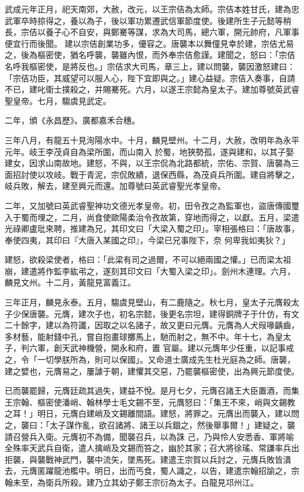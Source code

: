 \begin{pinyinscope}
 武成元年正月，祀天南郊，大赦，改元，以王宗佶為太師。宗佶本姓甘氏，建為忠武軍卒時掠得之，養以為子，後以軍功累遷武信軍節度使。後建所生子元懿等稍長，宗佶以養子心不自安，與鄭騫等謀，求為大司馬，總六軍，開元帥府，凡軍事便宜行而後聞。
 建以宗佶創業功多，優容之。唐襲本以舞僮見幸於建，宗佶尤易之，後為樞密使，猶名呼襲，襲雖內恨，而外奉宗佶愈謹。建聞之，怒曰：「宗佶名呼我樞密使，是將反也。」宗佶求大司馬，章三上，建以問襲，襲因激怒建曰：「宗佶功臣，其威望可以服人心，陛下宜即與之。」建心益疑。宗佶入奏事，自請不已，建叱衛士撲殺之，并賜騫死。六月，以遂王宗懿為皇太子。建加尊號英武睿聖皇帝。七月，騶虞見武定。



 二年，頒《永昌歷》。廣都嘉禾合穗。



 三年八月，有龍五十見洵陽水中。十月，麟見壁州。十二月，大赦，改明年為永平元年。岐王李茂貞自為梁所圍，而山南入
 於蜀，地狹勢孤，遂與建和，以其子娶建女，因求山南故地。建怒，不與，以王宗侃為北路都統，宗佑、宗賀、唐襲為三面招討使以攻岐。戰于青泥，宗侃敗績，退保西縣，為茂貞兵所圍。建自將擊之，岐兵敗，解去，建至興元而還。加尊號曰英武睿聖光孝皇帝。



 二年，又加號曰英武睿聖神功文德光孝皇帝。初，田令孜之為監軍也，盜唐傳國璽入于蜀而埋之，二月，尚食使歐陽柔治令孜故第，穿地而得之，以獻。五月，梁遣光祿卿盧玭來聘，推建為兄，其印文曰「大梁入蜀之印」。宰相張格曰：「唐故事，奉使四夷，其印曰『大唐入某國之印』，今梁已兄事陛下，奈
 何卑我如夷狄？」



 建怒，欲殺梁使者，格曰：「此梁有司之過爾，不可以絕兩國之懽。」已而梁太祖崩，建遣將作監李紘弔之，遂刻其印文曰「大蜀入梁之印」。劍州木連理。六月，麟見文州。十二月，黃龍見富義江。



 三年正月，麟見永泰。五月，騶虞見壁山，有二鹿隨之。秋七月，皇太子元膺殺太子少保唐襲。元膺，建次子也，初名宗懿，後更名宗坦，建得銅牌子于什仿，有文二十餘字，建以為符讖，因取之以名諸子，故又更曰元膺。元膺為人犬叚喙齲齒，多材藝，能射錢中孔，嘗自抱畫球擲馬上，馳而射之，無不中。年十七，為皇太子，判六軍，創天武神機營，開永和府，置
 官屬。建以元膺年少任重，以記事戒之，令「一切學朕所為，則可以保國」。又命道士廣成先生杜光庭為之師。唐襲，建之嬖也，元膺易之，屢謔于朝，建懼其交惡，乃罷襲樞密使，出為興元節度使。



 已而襲罷歸，元膺廷疏其過失，建益不悅。是月七夕，元膺召諸王大臣置酒，而集王宗翰、樞密使潘峭、翰林學士毛文錫不至，元膺怒曰：「集王不來，峭與文錫教之耳！」明日，元膺白建峭及文錫離間語。建怒，將罪之。元膺出而襲入，建以問之，襲曰：「太子謀作亂，欲召諸將、諸王以兵錮之，然後舉事爾！」建疑之，襲請召營兵入衛。元膺初不為備，聞襲召兵，以為誅
 己，乃與伶人安悉香、軍將喻全殊率天武兵自衛，遣人擒峭及文錫而笞之，幽於其家；召大將徐瑤、常謙率兵出拒襲，與襲戰神武門，襲中流矢，墜馬死。建遣王宗賀以兵討之，元膺兵敗皆潰去，元膺匿躍龍池檻中。明日，出而丐食，蜀人識之，以告，建遣宗翰招諭之，宗翰未至，為衛兵所殺。建乃立其幼子鄭王宗衍為太子。白龍見邛州江。




\end{pinyinscope}
